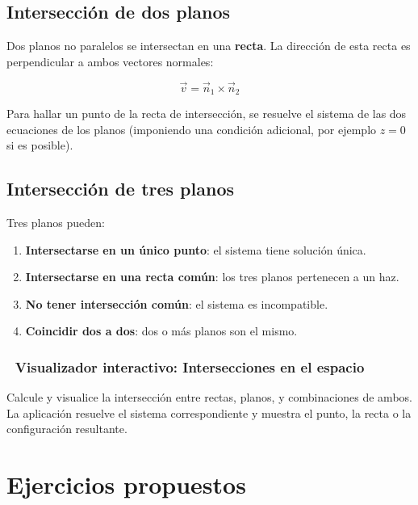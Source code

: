 \documentclass[
]{book}
\providecommand{\tightlist}{%
  \setlength{\itemsep}{0pt}\setlength{\parskip}{0pt}}
\begin{document}
\subsection{Intersección de dos planos}\label{intersecciuxf3n-de-dos-planos}

Dos planos no paralelos se intersectan en una \textbf{recta}. La dirección de esta recta es perpendicular a ambos vectores normales:

\[
\vec{v} = \vec{n}_1 \times \vec{n}_2
\]

Para hallar un punto de la recta de intersección, se resuelve el sistema de las dos ecuaciones de los planos (imponiendo una condición adicional, por ejemplo \(z = 0\) si es posible).

\subsection{Intersección de tres planos}\label{intersecciuxf3n-de-tres-planos}

Tres planos pueden:

\begin{enumerate}
\def\labelenumi{\arabic{enumi}.}
\tightlist
\item
  \textbf{Intersectarse en un único punto}: el sistema tiene solución única.
\item
  \textbf{Intersectarse en una recta común}: los tres planos pertenecen a un haz.
\item
  \textbf{No tener intersección común}: el sistema es incompatible.
\item
  \textbf{Coincidir dos a dos}: dos o más planos son el mismo.
\end{enumerate}

\subsubsection{🧮 Visualizador interactivo: Intersecciones en el espacio}\label{visualizador-interactivo-intersecciones-en-el-espacio}

Calcule y visualice la intersección entre rectas, planos, y combinaciones de ambos. La aplicación resuelve el sistema correspondiente y muestra el punto, la recta o la configuración resultante.

\section{Ejercicios propuestos}\label{ejercicios-propuestos-1}
\end{document}
